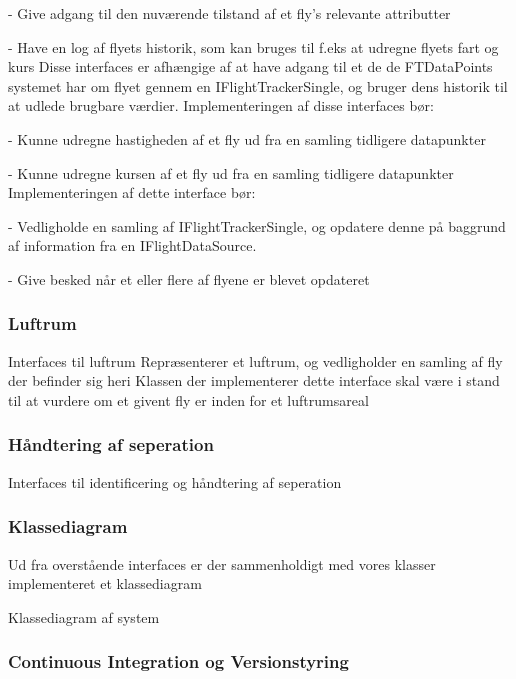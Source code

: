 - Give adgang til den nuværende tilstand af et fly's relevante attributter

- Have en log af flyets historik, som kan bruges til f.eks at udregne flyets fart og kurs
Disse interfaces er afhængige af at have adgang til et de de FTDataPoints systemet har om flyet gennem en IFlightTrackerSingle, og bruger dens historik til at udlede brugbare værdier.
Implementeringen af disse interfaces bør:

- Kunne udregne hastigheden af et fly ud fra en samling tidligere datapunkter

- Kunne udregne kursen af et fly ud fra en samling tidligere datapunkter
Implementeringen af dette interface bør:

- Vedligholde en samling af IFlightTrackerSingle, og opdatere denne på baggrund af information fra en IFlightDataSource.

- Give besked når et eller flere af flyene er blevet opdateret
\newpage
\subsubsection{Luftrum}

{Interfaces til luftrum}
Repræsenterer et luftrum, og vedligholder en samling af fly der befinder sig heri
Klassen der implementerer dette interface skal være i stand til at vurdere om et givent fly er inden for et luftrumsareal
\subsubsection{Håndtering af seperation}
{Interfaces til identificering og håndtering af seperation}
\newpage
\subsubsection{Klassediagram}
Ud fra overstående interfaces er der sammenholdigt med vores klasser implementeret et klassediagram

{Klassediagram af system}

\subsubsection{Continuous Integration og Versionstyring}

